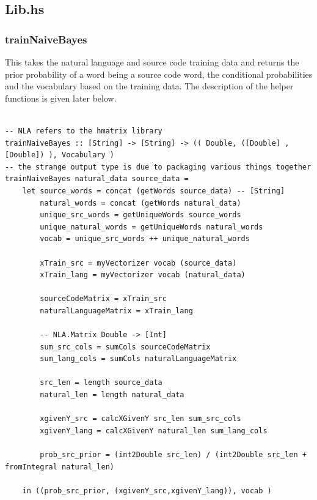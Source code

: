 \documentclass[12pt]{scrreprt}
\begin{document}
\subsection{Lib.hs}

\subsubsection{trainNaiveBayes}

This takes the natural language and source code training data and returns the prior probability of a word being a source code word, the conditional probabilities and the vocabulary based on the training data. The description of the helper functions is given later below. 

\begin{verbatim}

-- NLA refers to the hmatrix library
trainNaiveBayes :: [String] -> [String] -> (( Double, ([Double] , [Double]) ), Vocabulary )
-- the strange output type is due to packaging various things together
trainNaiveBayes natural_data source_data = 
    let source_words = concat (getWords source_data) -- [String]
        natural_words = concat (getWords natural_data)
        unique_src_words = getUniqueWords source_words
        unique_natural_words = getUniqueWords natural_words
        vocab = unique_src_words ++ unique_natural_words

        xTrain_src = myVectorizer vocab (source_data)
        xTrain_lang = myVectorizer vocab (natural_data)

        sourceCodeMatrix = xTrain_src
        naturalLanguageMatrix = xTrain_lang

        -- NLA.Matrix Double -> [Int]
        sum_src_cols = sumCols sourceCodeMatrix
        sum_lang_cols = sumCols naturalLanguageMatrix

        src_len = length source_data
        natural_len = length natural_data

        xgivenY_src = calcXGivenY src_len sum_src_cols
        xgivenY_lang = calcXGivenY natural_len sum_lang_cols

        prob_src_prior = (int2Double src_len) / (int2Double src_len + fromIntegral natural_len)

    in ((prob_src_prior, (xgivenY_src,xgivenY_lang)), vocab )
    
    
\end{verbatim}
\end{document}
